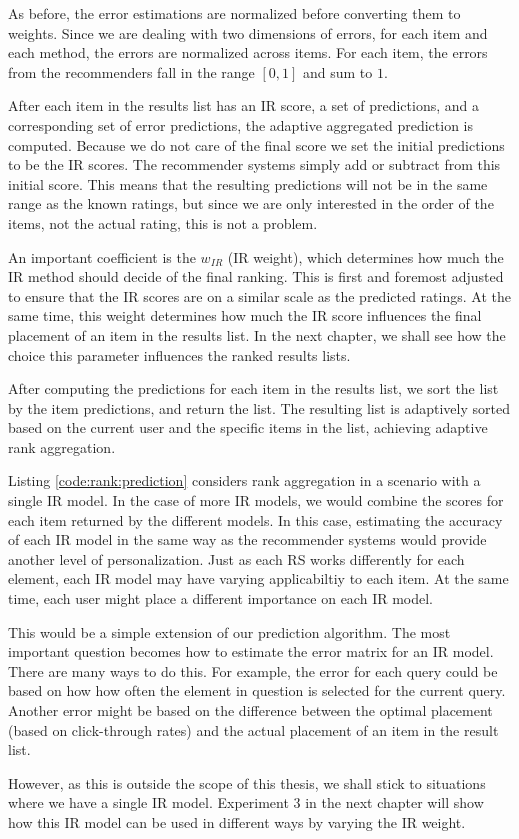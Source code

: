As before, the error estimations are normalized before converting them to weights.
Since we are dealing with two dimensions of errors, for each item and each method,
the errors are normalized across items.
For each item, the errors from the recommenders fall in the range $[0,1]$ and sum to $1$.

After each item in the results list has an IR score, a set of predictions, and a corresponding set of 
error predictions, the adaptive aggregated prediction is computed. 
Because we do not care of the final score we set the initial predictions to be the IR scores.
The recommender systems simply add or subtract from this initial score.
This means that the resulting predictions will not be in the same range as the known ratings,
but since we are only interested in the order of the items, not the actual rating, this is not a problem.

An important coefficient is the $w_{IR}$ (IR weight),
which determines how much the IR method should decide of the final ranking.
This is first and foremost adjusted to ensure that the IR scores
are on a similar scale as the predicted ratings.
At the same time, this weight determines how 
much the IR score influences the final placement of an item in the results list.
In the next chapter, we shall see how the choice this parameter 
influences the ranked results lists.

After computing the predictions for each item in the results list, 
we sort the list by the item predictions, and return the list.
The resulting list is adaptively sorted based on the current user and the specific items in the list,
achieving adaptive rank aggregation.

Listing \ref{code:rank:prediction} considers rank aggregation in a scenario with a single IR model.
In the case of more IR models,
we would combine the scores for each item returned by the different models.
In this case, estimating the accuracy of each IR model in the same way as the recommender systems
would provide another level of personalization.
Just as each RS works differently for each element, each IR model
may have varying applicabiltiy to each item.
At the same time, each user might place a different importance on each IR model.

This would be a simple extension of our prediction algorithm.
The most important question becomes how to estimate the error matrix for an IR model.
There are many ways to do this.
For example, the error for each query could be based on how 
how often the element in question is selected for the current query.
Another error might be based on the difference between
the optimal placement (based on click-through rates)
and the actual placement of an item in the result list.

However, as this is outside the scope of this thesis, 
we shall stick to situations where we have a single IR model.
Experiment 3 in the next chapter will show how this IR model can be used in different ways
by varying the IR weight.



